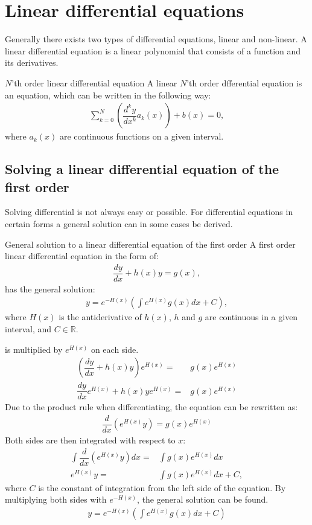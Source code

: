 \section{Linear differential equations}
Generally there exists two types of differential equations, linear and non-linear. A linear differential equation is a linear polynomial that consists of a function and its derivatives.
\begin{definition}{$N$'th order linear differential equation}{}
A linear $N$'th order dfferential equation is an equation, which can be written in the following way:
\begin{align*}
\sum_{k=0}^{N}\left(\dfrac{d^ky}{dx^k}a_k(x)\right)+b(x)=0,
\end{align*}
where $a_k(x)$ are continuous functions on a given interval.
\end{definition}
\subsection{Solving a linear differential equation of the first order}
Solving differential  is not always easy or possible. For differential equations in certain forms a general solution can in some cases be derived.
\begin{theorem}{General solution to a linear differential equation of the first order}{}
A first order linear differential equation in the form of:
\begin{align} \label{FODE_form}
\dfrac{dy}{dx}+h(x)y=g(x),
\end{align}
has the general solution:
\begin{align} \label{FODE_solution}
y=e^{-H(x)}\left(\int e^{H(x)}g(x)dx+C\right),
\end{align}
where $H(x)$ is the antiderivative of $h(x)$, $h$ and $g$ are continuous in a given interval, and $C\in \mathbb{R}$.
\end{theorem}
\begin{prof}{}{}
 is multiplied by $e^{H(x)}$ on each side.
\begin{align*}
\left(\dfrac{dy}{dx}+h(x)y\right)e^{H(x)}=&g(x)e^{H(x)}
\\
\dfrac{dy}{dx}e^{H(x)}+h(x)ye^{H(x)}=&g(x)e^{H(x)}
\end{align*}
Due to the product rule when differentiating, the equation can be rewritten as:
\begin{align*}
\dfrac{d}{dx}\left(e^{H(x)}y\right)=g(x)e^{H(x)}
\end{align*}
Both sides are then integrated with respect to $x$:
\begin{align*}
\int\dfrac{d}{dx}\left(e^{H(x)}y\right)dx=&\int g(x)e^{H(x)}dx
\\
e^{H(x)}y=&\int g(x)e^{H(x)}dx+C,
\end{align*}
where $C$ is the constant of integration from the left side of the  equation. By multiplying both sides with $e^{-H(x)}$, the general solution can be found.
\begin{align}
y=e^{-H(x)}\left(\int e^{H(x)}g(x)dx+C\right)
\end{align}
\end{prof}

